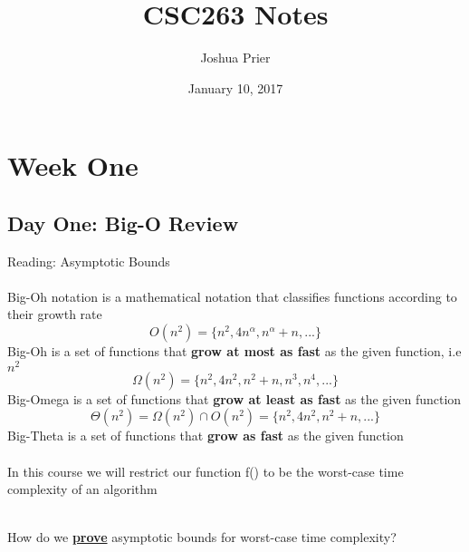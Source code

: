 \documentclass{article}
\title{CSC263 Notes}
\author{Joshua Prier}
\date{January 10, 2017}
\begin{document}
	\maketitle
	\section{Week One}
	\subsection{Day One: Big-O Review}
	
		Reading: Asymptotic Bounds\\
		\\
		Big-Oh notation is a mathematical notation that classifies functions according to their growth rate\\
		$$O(n^2) = \{n^2, 4n^{\alpha}, n^{\alpha} + n, ... \}$$
		Big-Oh is a set of functions that\textbf{ grow at most as fast} as the given function, i.e $n^2$\\
		$$\Omega(n^2) = \{n^2, 4n^2, n^2 + n, n^3, n^4, ...\}$$
		Big-Omega is a set of functions that \textbf{grow at least as fast} as the given function\\
		$$\Theta(n^2) = \Omega(n^2) \cap O(n^2) = \{n^2, 4n^2, n^2 + n, ...\}$$
		Big-Theta is a set of functions that \textbf{grow as fast} as the given function\\
		\\
		In this course we will restrict our function f() to be the worst-case time complexity of an algorithm\\
		\\
		\begin{center}
			\large{How do we \underline{\textbf{prove}} asymptotic bounds for worst-case time complexity?}\\
		\end{center}
		
\end{document}
